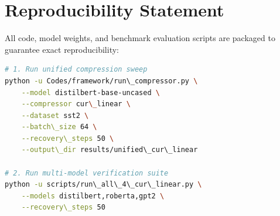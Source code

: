 \section{Reproducibility Statement}
All code, model weights, and benchmark evaluation scripts are packaged to guarantee exact reproducibility:
\begin{lstlisting}[language=bash]
# 1. Run unified compression sweep
python -u Codes/framework/run\_compressor.py \
    --model distilbert-base-uncased \
    --compressor cur\_linear \
    --dataset sst2 \
    --batch\_size 64 \
    --recovery\_steps 50 \
    --output\_dir results/unified\_cur\_linear

# 2. Run multi-model verification suite
python -u scripts/run\_all\_4\_cur\_linear.py \
    --models distilbert,roberta,gpt2 \
    --recovery\_steps 50
\end{lstlisting}
